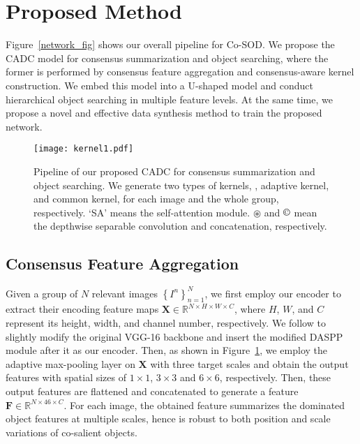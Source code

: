 \documentclass[10pt,twocolumn,letterpaper]{article}
\begin{document}
\section{Proposed Method}
Figure~\ref{network_fig} shows our overall pipeline for Co-SOD. We propose the CADC model for consensus summarization and object searching, where the former is performed by consensus feature aggregation and consensus-aware kernel construction. We embed this model into a U-shaped \cite{ronneberger2015unet} model and conduct hierarchical object searching in multiple feature levels.
At the same time, we propose a novel and effective data synthesis method to train the proposed network.

\begin{figure*}[!t]
  \graphicspath{{Figures/dynamic_kernel/}}
  \centering
  \texttt{[image: kernel1.pdf]}
  \caption{Pipeline of our proposed CADC for consensus summarization and object searching. We generate two types of kernels, \ie, adaptive kernel, and common kernel, for each image and the whole group, respectively. `SA' means the self-attention module. $\circledast$ and $\copyright$  mean the depthwise separable convolution and concatenation, respectively.}
  \label{kernel}
  \vspace{-0.3cm}
\end{figure*}

\subsection{Consensus Feature Aggregation}

Given a group of $N$ relevant images $\left\{I^n \right\}^N_{n=1}$, we first employ our encoder to extract their encoding feature maps $\bm{X}\in{\mathbb{R}^{N\times{H\times{W\times C}}}}$, where $H$, $W$, and $C$ represent its height, width, and channel number, respectively.
We follow \cite{liu2020S2MA} to slightly modify the original VGG-16 \cite{simonyan2014vgg} backbone and insert the modified DASPP module \cite{yang2018denseaspp} after it as our encoder.
Then, as shown in Figure~\ref{kernel}, we employ the adaptive max-pooling layer on $\bm{X}$ with three target scales and obtain the output features with spatial sizes of $1 \times 1$, $3 \times 3$ and $6\times 6$, respectively. Then, these output features are flattened and concatenated to generate a feature $\bm{F}\in{\mathbb{R}^{N\times{46\times C}}}$. For each image, the obtained feature summarizes the dominated object features at multiple scales, hence is robust to both position and scale variations of co-salient objects.
\end{document}
